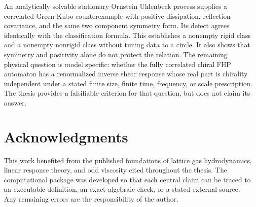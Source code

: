 \documentclass[11pt,a4paper,twoside]{report}
\begin{document}
An analytically solvable stationary Ornstein Uhlenbeck process supplies a correlated Green Kubo counterexample with positive dissipation, reflection covariance, and the same two component symmetry form. Its defect agrees identically with the classification formula. This establishes a nonempty rigid class and a nonempty nonrigid class without tuning data to a circle. It also shows that symmetry and positivity alone do not protect the relation. The remaining physical question is model specific: whether the fully correlated chiral FHP automaton has a renormalized inverse shear response whose real part is chirality independent under a stated finite size, finite time, frequency, or scale prescription. The thesis provides a falsifiable criterion for that question, but does not claim its answer.

\chapter*{Acknowledgments}
This work benefited from the published foundations of lattice gas hydrodynamics, linear response theory, and odd viscosity cited throughout the thesis. The computational package was developed so that each central claim can be traced to an executable definition, an exact algebraic check, or a stated external source. Any remaining errors are the responsibility of the author.

\tableofcontents
\listoffigures
\listoftables
\glsaddall
\printglossary[type=\acronymtype,title=List of Abbreviations]
\clearpage
{}
\setcounter{page}{1}











\appendix






\printglossary[title=Glossary]


\end{document}
